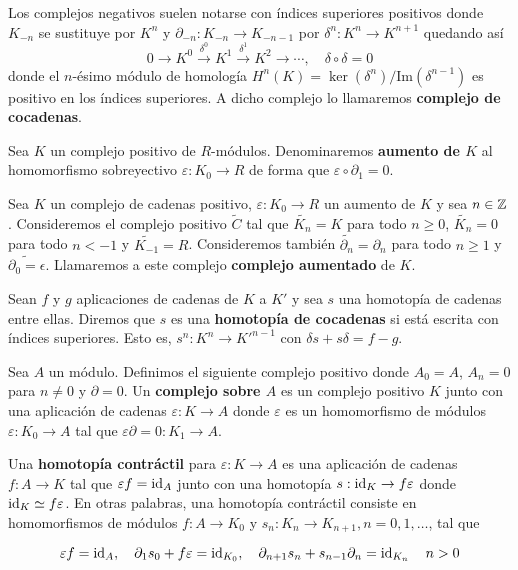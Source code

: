 Los complejos negativos suelen notarse con índices superiores positivos donde $K_{-n}$ se sustituye por $K^n$ y $\partial_{-n} : K_{-n} \rightarrow K_{-n-1}$ por $\delta^n: K^n \rightarrow K^{n+1}$ quedando así
\[ 0 \to K^0 \xrightarrow{\delta^0} K^1 \xrightarrow{\delta^1} K^2 \to \cdots, \quad \delta \circ \delta = 0 \]
donde el $n$-ésimo módulo de homología \( H^n(K) = \ker(\delta^n)/\text{Im}(\delta^{n-1}) \) es positivo en los índices superiores. A dicho complejo lo llamaremos \textbf{complejo de cocadenas}.

\begin{definicion}
	Sea $K$ un complejo positivo de $R$-módulos. Denominaremos \textbf{aumento de $K$} al homomorfismo sobreyectivo $\varepsilon : K_0 \to R$ de forma que $\varepsilon \circ \partial_1 = 0$.
\end{definicion}

\begin{definicion}
	Sea $K$ un complejo de cadenas positivo, $\varepsilon : K_0 \to R$ un aumento de $K$ y sea $n \in \mathbb{Z}$. Consideremos el complejo positivo $\widetilde{C}$ tal que $\widetilde{K_n} = K$ para todo $n \geq 0$, $\widetilde{K_n} = 0$ para todo $n < -1$ y $\widetilde{K_{-1}}=R$. Consideremos también $\widetilde{\partial_n} = \partial_n$ para todo $n \geq 1$ y $\widetilde{\partial_0= \epsilon}$. Llamaremos a este complejo \textbf{complejo aumentado} de $K$.
\end{definicion}

\begin{definicion}
Sean $f$ y $g$ aplicaciones de cadenas de $K$ a $K'$ y sea $s$ una homotopía de cadenas entre ellas. Diremos que $s$ es una \textbf{homotopía de cocadenas} si  está escrita con índices superiores. Esto es, \( s^n: K^n \to K'^{n-1} \) con \( \delta s + s \delta = f - g \).
\end{definicion}

\begin{definicion}
	Sea $A$ un módulo. Definimos el siguiente complejo positivo donde \( A_0 = A \), \( A_n = 0 \) para \( n \neq 0 \) y \( \partial = 0 \). Un \textbf{complejo sobre \( A \)} es un complejo positivo \( K \) junto con una aplicación de cadenas \( \varepsilon: K \to A \) donde \( \varepsilon \) es un homomorfismo de módulos \( \varepsilon: K_0 \to A \) tal que \( \varepsilon \partial = 0: K_1 \to A \).
\end{definicion}

\begin{definicion}
\label{def:contr_homotopy}
Una \textbf{homotopía contráctil} para \( \varepsilon: K \to A \) es una aplicación de cadenas \( f: A \to K \) tal que \( \varepsilon f = \operatorname{id}_A \) junto con una homotopía \( s: \operatorname{id}_K \rightarrow f \varepsilon \) donde \( \operatorname{id}_K \simeq f \varepsilon \). En otras palabras, una homotopía contráctil consiste en homomorfismos de módulos \( f: A \to K_0 \) y \( s_n: K_n \to K_{n+1}, n = 0, 1, \dots \), tal que

\[ \varepsilon f = \operatorname{id}_A, \quad \partial_{1} s_0 + f \varepsilon = \operatorname{id}_{K_0}, \quad \partial_{n+1} s_n + s_{n-1} \partial_n = \operatorname{id}_{K_n} \quad n > 0 \]
\end{definicion}


